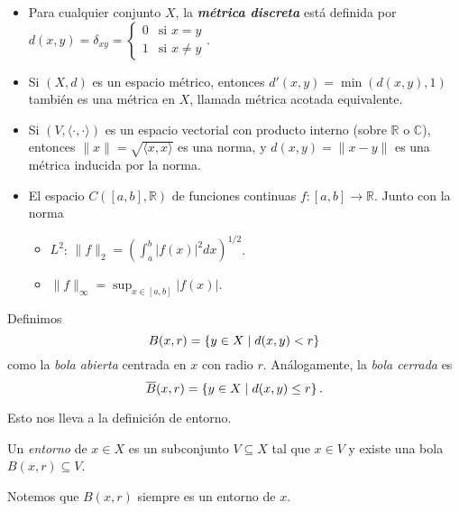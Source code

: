 \begin{example}
\begin{itemize}
    \item Para cualquier conjunto $X$, la \textbf{\textit{métrica discreta}} está definida por $d(x, y) = \delta_{xy} = \begin{cases} 0 & \text{si } x = y \\ 1 & \text{si } x \neq y \end{cases}$.

    \item Si $(X, d)$ es un espacio métrico, entonces $d'(x, y) = \min(d(x, y), 1)$ también es una métrica en $X$, llamada métrica acotada equivalente.

    \item Si $(V, \langle \cdot, \cdot \rangle)$ es un espacio vectorial con producto interno (sobre $\mathbb{R}$ o $\mathbb{C}$), entonces $\|x\| = \sqrt{\langle x, x \rangle}$ es una norma, y $d(x, y) = \|x - y\|$ es una métrica inducida por la norma.

    \item El espacio $C([a, b], \mathbb{R})$ de funciones continuas $f: [a, b] \to \mathbb{R}$. Junto con la norma
    \begin{itemize}
        \item $L^2$: $\|f\|_2 = \left( \int_a^b |f(x)|^2 dx \right)^{1/2}$.
        \item $\|f\|_{\infty} = \sup_{x \in [a,b]} |f(x)|$.
    \end{itemize}
\end{itemize}
\end{example}

\begin{definition}
    Definimos
    $$
        B(x, r) = \left\{  y \in X \mid d(x, y) < r \right\}
    $$ como la \emph{bola abierta} centrada en $x$ con radio $r$. Análogamente, la \emph{bola cerrada} es 
    $$
        \overline{B}(x, r) = \left\{  y \in X \mid d(x, y) \leq  r \right\}.
    $$
\end{definition}

Esto nos lleva a la definición de entorno.

\begin{definition}
    Un \emph{entorno} de $x \in X$ es un subconjunto $V \subseteq X$ tal que $x \in V$ y existe una bola $B(x, r) \subseteq V$.
\end{definition}

\begin{remark}
    Notemos que $B(x, r)$ siempre es un entorno de $x$.
\end{remark}


